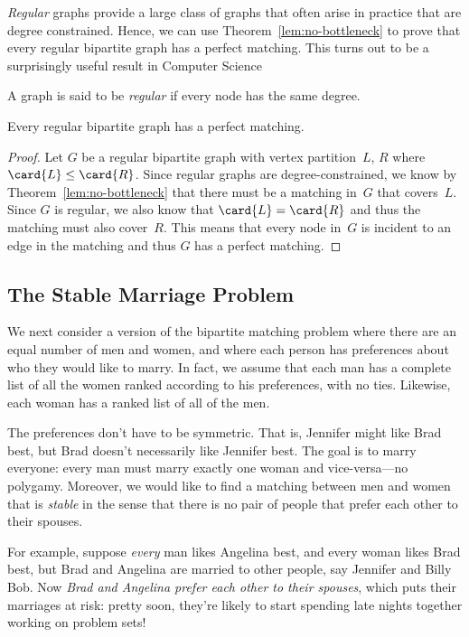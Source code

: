 \emph{Regular} graphs provide a large class of graphs that often arise
in practice that are degree constrained.  Hence, we can use
Theorem~\ref{lem:no-bottleneck} to prove that every regular bipartite
graph has a perfect matching.  This turns out to be a surprisingly
useful result in Computer Science

\begin{definition}\label{def:5P}
A graph is said to be \emph{regular} if every node has the same degree.
\end{definition}

\begin{theorem}\label{thm:5M}
Every regular bipartite graph has a perfect matching.
\end{theorem}

\begin{proof}
Let $G$ be a regular bipartite graph with vertex partition~$L$, $R$
where $\card{L} \leq \card{R}$.  Since regular graphs are
degree-constrained, we know by Theorem~\ref{lem:no-bottleneck} that
there must be a matching in~$G$ that covers~$L$.  Since $G$ is
regular, we also know that $\card{L} = \card{R}$ and thus the matching
must also cover~$R$.  This means that every node in~$G$ is incident to
an edge in the matching and thus $G$ has a perfect matching.
\end{proof}

\subsection{The Stable Marriage Problem}
\label{stablemarriagesec}

We next consider a version of the bipartite matching problem where
there are an equal number of men and women, and where each person has
preferences about who they would like to marry.  In fact, we assume
that each man has a complete list of all the women ranked according
to his preferences, with no ties.  Likewise, each woman has a ranked
list of all of the men.

The preferences don't have to be symmetric.  That is, Jennifer might
like Brad best, but Brad doesn't necessarily like Jennifer best.  The
goal is to marry everyone: every man must marry exactly one woman and
vice-versa---no polygamy.  Moreover, we would like to find a matching
between men and women that is \emph{stable} in the sense that there is
no pair of people that prefer each other to their spouses.

For example, suppose \emph{every} man likes Angelina best, and every
woman likes Brad best, but Brad and Angelina are married to other
people, say Jennifer and Billy Bob.  Now \emph{Brad and Angelina
  prefer each other to their spouses}, which puts their marriages at
risk: pretty soon, they're likely to start spending late nights
together working on problem sets!

